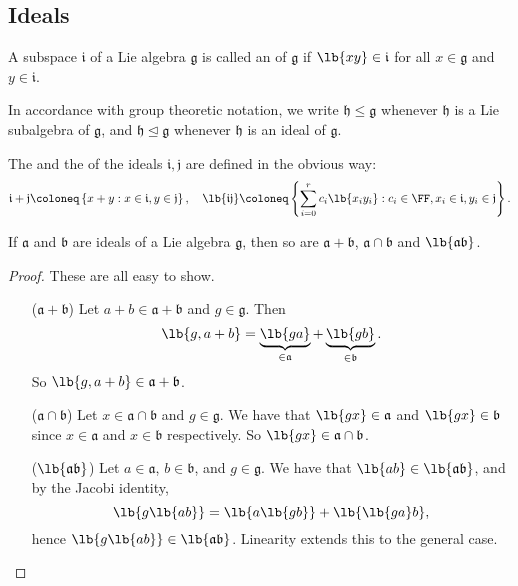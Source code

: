 \documentclass{article}
\newcommand*\tleq{\ensuremath{\mathrel{\unlhd}}}
\DeclarePairedDelimiter\lb\lbrack\rbrack
\newcommand*\frka{{\ensuremath{\mathfrak{a}}}}
\newcommand*\frkb{{\ensuremath{\mathfrak{b}}}}
\newcommand*\frkg{{\ensuremath{\mathfrak{g}}}}
\newcommand*\frkh{{\ensuremath{\mathfrak{h}}}}
\newcommand*\frki{{\ensuremath{\mathfrak{i}}}}
\newcommand*\frkj{{\ensuremath{\mathfrak{j}}}}
\begin{document}
\subsection{Ideals}

\begin{definition}
    A subspace $\frki$ of a Lie algebra $\frkg$ is called an  of $\frkg$ if $\lb{xy} \in \frki$ for all $x \in \frkg$ and $y \in \frki$.
\end{definition}

\begin{convention}
    In accordance with group theoretic notation, we write $\frkh \leq \frkg$ whenever $\frkh$ is a Lie subalgebra of $\frkg$, and $\frkh \tleq \frkg$ whenever $\frkh$ is an ideal of $\frkg$.
\end{convention}

The  and the  of the ideals $\frki, \frkj$ are defined in the obvious way:
\[
    \frki + \frkj
    \coloneq
    \left\{
        x + y : x \in \frki, y \in \frkj
    \right\},\quad
    \lb{\frki\frkj}
    \coloneq
    \left\{
        \sum_{i=0}^rc_i\lb{x_iy_i}
        :
        c_i \in \FF, x_i \in \frki, y_i \in \frkj
    \right\}.
\]

\begin{theorem}
    If $\frka$ and $\frkb$ are ideals of a Lie algebra $\frkg$, then so are $\frka + \frkb$, $\frka \cap \frkb$ and $\lb{\frka\frkb}$.
\end{theorem}
\begin{proof}
    These are all easy to show.
    \begin{itemize}
        \item[($\frka+\frkb$)]
            Let $a + b \in \frka + \frkb$ and $g \in \frkg$.
            Then
            \[
                \lb{g,a+b}
                =
                \underbrace{
                    \lb{ga}
                }_{\in \frka}
                +
                \underbrace{
                    \lb{gb}
                }_{\in \frkb}.
            \]
            So $\lb{g,a+b} \in \frka+\frkb$.
        \item[($\frka \cap \frkb$)]
            Let $x \in \frka \cap \frkb$ and $g \in \frkg$.
            We have that $\lb{gx} \in \frka$ and $\lb{gx} \in \frkb$ since $x \in \frka$ and $x \in \frkb$ respectively.
            So $\lb{gx} \in \frka \cap \frkb$.
        \item[($\lb{\frka\frkb}$)]
            Let $a \in \frka$, $b \in \frkb$, and $g \in \frkg$.
            We have that $\lb{ab} \in \lb{\frka\frkb}$, and by the Jacobi identity,
            \[
                \lb{g\lb{ab}}
                =
                \lb{a\lb{gb}}
                +
                \lb{\lb{ga}b},
            \]
            hence $\lb{g\lb{ab}} \in \lb{\frka\frkb}$.
            Linearity extends this to the general case.
    \end{itemize}
\end{proof}
\end{document}
